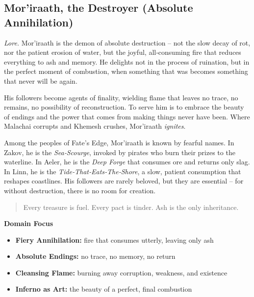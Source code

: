 \subsection{Mor'iraath, the Destroyer (Absolute Annihilation)}

\textit{Lore.} Mor'iraath is the demon of absolute destruction – not the slow decay of rot, nor the patient erosion of water, but the joyful, all‑consuming fire that reduces everything to ash and memory. He delights not in the process of ruination, but in the perfect moment of combustion, when something that was becomes something that never will be again.

His followers become agents of finality, wielding flame that leaves no trace, no remains, no possibility of reconstruction. To serve him is to embrace the beauty of endings and the power that comes from making things never have been. Where Malachai corrupts and Khemesh crushes, Mor'iraath \textit{ignites}.

Among the peoples of Fate's Edge, Mor'iraath is known by fearful names. In Zakov, he is the \textit{Sea‑Scourge}, invoked by pirates who burn their prizes to the waterline. In Aeler, he is the \textit{Deep Forge} that consumes ore and returns only slag. In Linn, he is the \textit{Tide‑That‑Eats‑The‑Shore}, a slow, patient consumption that reshapes coastlines. His followers are rarely beloved, but they are essential – for without destruction, there is no room for creation.

\begin{quote}
Every treasure is fuel. Every pact is tinder. Ash is the only inheritance.
\end{quote}

\noindent\textbf{Domain Focus}
\begin{itemize}
  \item \textbf{Fiery Annihilation:} fire that consumes utterly, leaving only ash
  \item \textbf{Absolute Endings:} no trace, no memory, no return
  \item \textbf{Cleansing Flame:} burning away corruption, weakness, and existence
  \item \textbf{Inferno as Art:} the beauty of a perfect, final combustion
\end{itemize}

